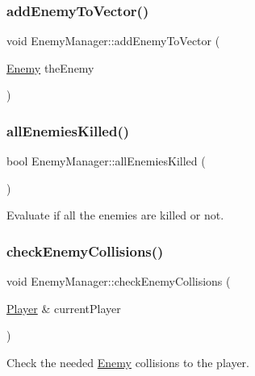 \subsubsection{\texorpdfstring{add\+Enemy\+To\+Vector()}{addEnemyToVector()}}
{\footnotesize\ttfamily void Enemy\+Manager\+::add\+Enemy\+To\+Vector (\begin{DoxyParamCaption}\item[{\hyperlink{class_enemy}{Enemy}}]{the\+Enemy }\end{DoxyParamCaption})\hspace{0.3cm}{\ttfamily [inline]}}

\mbox{\label{class_enemy_manager_a9395ad36205c9653b4511859fb82179a}} 
\subsubsection{\texorpdfstring{all\+Enemies\+Killed()}{allEnemiesKilled()}}
{\footnotesize\ttfamily bool Enemy\+Manager\+::all\+Enemies\+Killed (\begin{DoxyParamCaption}{ }\end{DoxyParamCaption})}



Evaluate if all the enemies are killed or not. 

\mbox{\label{class_enemy_manager_a317b11ce52e67c7b760b2b81755fd95f}} 
\subsubsection{\texorpdfstring{check\+Enemy\+Collisions()}{checkEnemyCollisions()}}
{\footnotesize\ttfamily void Enemy\+Manager\+::check\+Enemy\+Collisions (\begin{DoxyParamCaption}\item[{\hyperlink{class_player}{Player} \&}]{current\+Player }\end{DoxyParamCaption})}



Check the needed \hyperlink{class_enemy}{Enemy} collisions to the player. 


